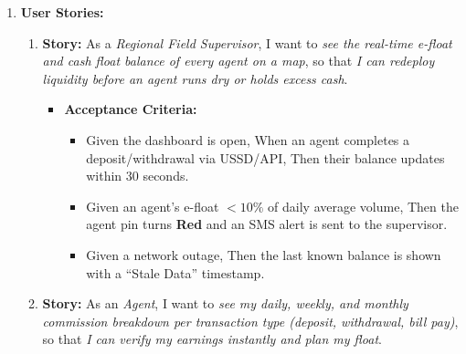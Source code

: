 \documentclass[11pt]{article}
\begin{document}
\begin{exoresolu}
\begin{enumerate}
\begin{enumerate}
        \item \textbf{Observation / Job Shadowing (2 days per region):} \emph{Why:} Many agents have low formal literacy; they use USSD codes by heart. Watching them reveals error-prone steps (e.g., mistyping a long USSD string), how they handle float (cash vs e-money), and trust issues with supervisors. Interviews alone would miss these tacit workflows.
        \item \textbf{Semi-structured Interviews (with Supervisors translating if needed):} \emph{Why:} To capture pain points in their own words (e.g., ``I don't know my commission until the 5th of next month''), understand local constraints (power cuts, network downtime), and build trust for adoption.
        \item \textbf{Document Analysis (Paper Registers + USSD Logs + Bank Statements):} \emph{Why:} Quantify transaction volumes, error rates, reconciliation discrepancies. Provides baseline data for dashboard KPIs (e.g., average float holding period).
    \end{enumerate}
    \item \textbf{User Stories:}
    \begin{enumerate}
        \item \textbf{Story:} As a \emph{Regional Field Supervisor}, I want to \emph{see the real-time e-float and cash float balance of every agent on a map}, so that \emph{I can redeploy liquidity before an agent runs dry or holds excess cash}.
        \begin{itemize}
            \item \textbf{Acceptance Criteria:}
            \begin{itemize}
                \item Given the dashboard is open, When an agent completes a deposit/withdrawal via USSD/API, Then their balance updates within 30 seconds.
                \item Given an agent's e-float $< 10\%$ of daily average volume, Then the agent pin turns \textbf{Red} and an SMS alert is sent to the supervisor.
                \item Given a network outage, Then the last known balance is shown with a ``Stale Data'' timestamp.
            \end{itemize}
        \end{itemize}
        \item \textbf{Story:} As an \emph{Agent}, I want to \emph{see my daily, weekly, and monthly commission breakdown per transaction type (deposit, withdrawal, bill pay)}, so that \emph{I can verify my earnings instantly and plan my float}.

\end{enumerate}
\end{enumerate}
\end{exoresolu}
\end{document}
